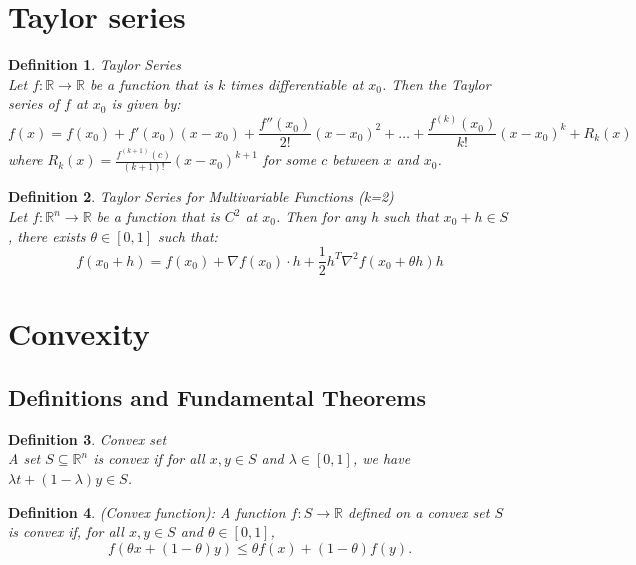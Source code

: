 \documentclass[11pt]{book} %
\newtheorem{definition}{Definition}[section]
\begin{document}
\section{Taylor series}
\begin{definition}{Taylor Series} \\
Let $f: \mathbb{R} \rightarrow \mathbb{R}$ be a function that is $k$ times differentiable at $x_0$. Then the Taylor series of $f$ at $x_0$ is given by:
\begin{equation}
    f(x) = f(x_0) + f'(x_0)(x-x_0) + \frac{f''(x_0)}{2!}(x-x_0)^2 + \ldots + \frac{f^{(k)}(x_0)}{k!}(x-x_0)^k + R_k(x)
\end{equation}
where $R_k(x) = \frac{f^{(k+1)}(c)}{(k+1)!}(x-x_0)^{k+1}$ for some $c$ between $x$ and $x_0$.
\end{definition}

\bigbreak

\begin{definition}{Taylor Series for Multivariable Functions (k=2) } \\
Let $f: \mathbb{R}^n \rightarrow \mathbb{R}$ be a function that is $C^2$ at $x_0$. Then for any h such that $x_0 + h \in S$, there exists $\theta \in [0,1]$ such that:
\begin{equation}
    f(x_0 + h) = f(x_0) + \nabla f(x_0) \cdot h + \frac{1}{2} h^T \nabla^2 f(x_0 + \theta h) h
\end{equation}
\end{definition}

\bigbreak


\section{Convexity}

\subsection{Definitions and Fundamental Theorems}

\begin{definition}{Convex set} \\
    A set $S \subseteq \mathbb{R}^n$ is convex if for all $x,y \in S$ and $\lambda \in [0,1]$, we have $\lambda t + (1- \lambda)y \in S$.
\end{definition}    

\begin{definition} (Convex function): A function $f : S \rightarrow \mathbb{R}$ defined on a convex set $S$ is convex if, for all $x, y \in S$ and $\theta \in [0,1]$, 
\[ f(\theta x + (1-\theta)y) \leq \theta f(x) + (1-\theta) f(y). \]
\end{definition}
\end{document}
